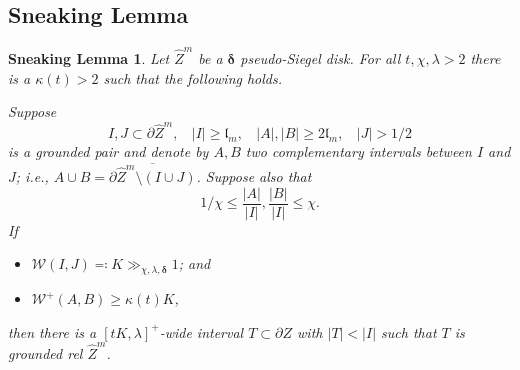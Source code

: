 \documentclass{amsart}
\renewcommand{\sp}{{\ \ }}
\newcommand{\1}{{\mathbb 1 }}
\newcommand{\Width}{{\mathcal W}}
\newcommand{\wZ}{{\widehat Z}}
\newcommand{\length}{{\mathfrak l}}
\newtheorem{sneaklmm}[thm]{Sneaking Lemma}
\theoremstyle{remark}
\numberwithin{equation}{section}
\theoremstyle{definition}
\newcommand{\bdelta}{{\boldsymbol{ \delta}}}
\begin{document}
\subsection{Sneaking Lemma}
\begin{sneaklmm}
\label{lem:sneaking}
Let $\wZ^m$ be a $\bdelta$ pseudo-Siegel disk. For all $t, \chi, \lambda>2$ there is a $\kappa (t)>2$ such that the following holds.

Suppose \[I,J\subset \partial \wZ^m,\sp\sp |I|\ge \length_m, \sp  \sp |A|,|B| \ge  2\length_m,\sp\sp  |J|> 1/2\] is a grounded pair and denote by $A,B$ two complementary intervals between $I$ and $J$; i.e., $A\cup B =\overline{\partial \wZ^m\setminus (I\cup J)}$. Suppose also that
\[  1/\chi \le \frac{|A|}{|I|}, \frac{|B|}{|I|}\le \chi.\]
If
\begin{itemize}
\item  $\Width(I,J)\eqqcolon K\gg_{\chi,\lambda, \bdelta} 1$; and
\item $\Width^+(A,B) \ge \kappa(t) K$,
\end{itemize}
then there is a $[tK,\lambda]^+$-wide interval $T\subset \partial Z$ with $|T| < |I|$ such that $T$ is grounded rel $\wZ^m$.
\end{sneaklmm}
\end{document}
